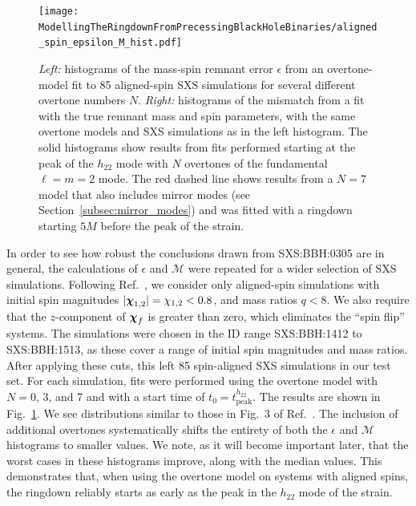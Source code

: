 \begin{figure}[t]
    \centering
    \texttt{[image: ModellingTheRingdownFromPrecessingBlackHoleBinaries/aligned\_spin\_epsilon\_M\_hist.pdf]}
    \caption[Remnant-property errors and mismatches for the overtone model fitted to aligned-spin SXS simulations]{\emph{Left:} histograms of the mass-spin remnant error $\epsilon$ from an overtone-model fit to 85 aligned-spin SXS simulations for several different overtone numbers $N$. 
    \emph{Right:} histograms of the mismatch from a fit with the true remnant mass and spin parameters, with the same overtone models and SXS simulations as in the left histogram.
    The solid histograms show results from fits performed starting at the peak of the $h_{22}$ mode with $N$ overtones of the fundamental $\ell = m = 2$ mode.
    The red dashed line shows results from a $N=7$ model that also includes mirror modes (see Section~\ref{subsec:mirror_modes}) and was fitted with a ringdown starting $5M$ before the peak of the strain.}
    \label{aligned_spin_epsilon_hist}
\end{figure}

In order to see how robust the conclusions drawn from SXS:BBH:0305 are in general, the calculations of $\epsilon$ and $\mathcal{M}$ were repeated for a wider selection of SXS simulations. Following Ref.~\cite{Giesler:2019uxc}, we consider only aligned-spin simulations with initial spin magnitudes $|\vb*{\chi}_{1,2}| = \chi_{1,2} < 0.8$, and mass ratios $q < 8$. We also require that the $z$-component of $\vb*{\chi}_f$ is greater than zero, which eliminates the ``spin flip'' systems. The simulations were chosen in the ID range SXS:BBH:1412 to SXS:BBH:1513, as these cover a range of initial spin magnitudes and mass ratios.
After applying these cuts, this left 85 spin-aligned SXS simulations in our test set.
For each simulation, fits were performed using the overtone model with $N=0$, 3, and 7 and with a start time of $t_0 = t_{\mathrm{peak}}^{h_{22}}$. 
The results are shown in Fig.~\ref{aligned_spin_epsilon_hist}. 
We see distributions similar to those in Fig.~3 of Ref.~\cite{Giesler:2019uxc}. 
The inclusion of additional overtones systematically shifts the entirety of both the $\epsilon$ and $\mathcal{M}$ histograms to smaller values.
We note, as it will become important later, that the worst cases in these histograms improve, along with the median values.
This demonstrates that, when using the overtone model on systems with aligned spins, the ringdown reliably starts as early as the peak in the $h_{22}$ mode of the strain. 


